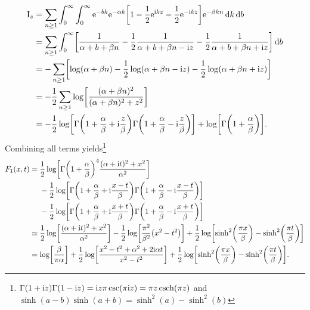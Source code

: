 \documentclass[english, parskip=full]{scrartcl}
\begin{document}
\begin{align}
\text{I}_z &= \sum_{n\ge 1} \intx{0}{\infty}{ \intx{0}{\infty}{\powe{-bk} \powe{-\alpha k} \klb*{1 - \frac{1}{2} \powe{\i k z} - \frac{1}{2} \powe{-\i kz}} \powe{-\beta kn}}{k} }{b}\\
&= \sum_{n\ge 1} \intx{0}{\infty}{\klb*{\frac{1}{\alpha + b + \beta n} - \frac{1}{2} \frac{1}{\alpha + b + \beta n - \i z} - \frac{1}{2} \frac{1}{\alpha + b + \beta n + \i z}}}{b}\\
&= -\sum_{n\ge 1} \klb*{\log\kla*{\alpha + \beta n} - \frac{1}{2} \log\kla*{\alpha + \beta n - \i z} - \frac{1}{2} \log \kla*{\alpha + \beta n + \i z}}\\
&= -\frac{1}{2} \sum_{n\ge 1} \log\klb[\bigg]{\frac{(\alpha + \beta n)^2}{(\alpha + \beta n)^2 + z^2}}\\
&= -\frac{1}{2} \log \klb[\bigg]{\Gamma\kla*{1 + \frac{\alpha}{\beta} + \i \frac{z}{\beta}} \Gamma\kla*{1 + \frac{\alpha}{\beta} - \i \frac{z}{\beta}}} + \log \klb*{\Gamma\kla*{1+ \frac{\alpha}{\beta}}}.
\end{align}
Combining all terms yields\footnote{$\Gamma(1+\i z)\Gamma(1-\i z) = \i z \pi \csc(\pi\i z) = \pi z \csch(\pi z)$ and $\sinh(a-b)\sinh(a+b) = \sinh^2(a) - \sinh^2(b)$}
\begin{align}
F_1(x,t) &= \bsplit{&\frac{1}{2} \log \klb[\bigg]{ \Gamma\kla*{1 + \frac{\alpha}{\beta}}^4 \frac{(\alpha + \i t)^2 + x^2}{\alpha^2}} \\
&- \frac{1}{2} \log \klb[\bigg]{\Gamma\kla*{1 + \frac{\alpha}{\beta} + \i \frac{x-t}{\beta}} \Gamma\kla*{1 + \frac{\alpha}{\beta} - \i \frac{x-t}{\beta}}}\\
&- \frac{1}{2} \log \klb[\bigg]{\Gamma\kla*{1 + \frac{\alpha}{\beta} + \i \frac{x+t}{\beta}} \Gamma\kla*{1 + \frac{\alpha}{\beta} - \i \frac{x+t}{\beta}}}}\\
&\simeq \frac{1}{2} \log\klb*{\frac{(\alpha + \i t)^2 + x^2}{\alpha^2}} - \frac{1}{2} \log\klb*{\frac{\pi^2}{\beta^2} \kla*{x^2 - t^2}} + \frac{1}{2} \log\klb*{\sinh^2\kla*{\frac{\pi x}{\beta}} - \sinh^2\kla*{\frac{\pi t}{\beta}}}\\
&= \log\klb*{\frac{\beta}{\pi\alpha}} + \frac{1}{2} \log\klb*{\frac{x^2 - t^2 + \alpha^2 + 2\i\alpha t}{x^2 - t^2}} + \frac{1}{2} \log\klb*{\sinh^2\kla*{\frac{\pi x}{\beta}} - \sinh^2\kla*{\frac{\pi t}{\beta}}}.
\end{align}
\end{document}
